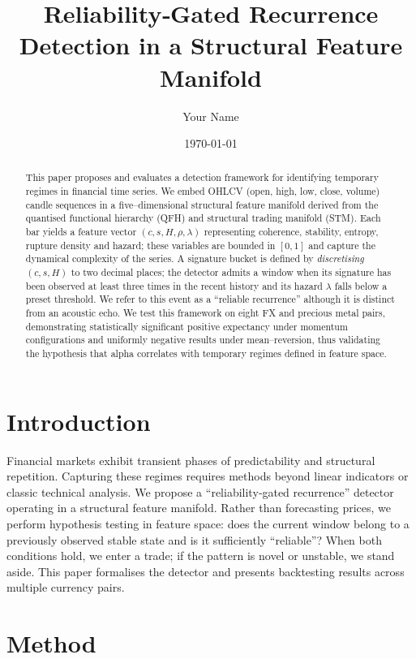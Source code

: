 \documentclass[11pt]{article}
\title{Reliability‑Gated Recurrence Detection in a Structural Feature Manifold}
\author{Your Name}
\date{\today}
\begin{document}
\maketitle

\begin{abstract}
This paper proposes and evaluates a detection framework for
identifying temporary regimes in financial time series.  We embed
OHLCV (open, high, low, close, volume) candle sequences in a
five–dimensional structural feature manifold derived from the
quantised functional hierarchy (QFH) and structural trading manifold
(STM).  Each bar yields a feature vector $(c,s,H,\rho,\lambda)$
representing coherence, stability, entropy, rupture density and
hazard; these variables are bounded in $[0,1]$ and capture the
dynamical complexity of the series.  A signature bucket is defined by
\emph{discretising} $(c,s,H)$ to two decimal places; the detector admits a
window when its signature has been observed at least three times in
the recent history and its hazard $\lambda$ falls below a preset
threshold.  We refer to this event as a ``reliable recurrence''
although it is distinct from an acoustic echo.  We test this
framework on eight FX and precious metal pairs, demonstrating
statistically significant positive expectancy under momentum
configurations and uniformly negative results under mean–reversion,
thus validating the hypothesis that alpha correlates with temporary
regimes defined in feature space.
\end{abstract}

\section{Introduction}
Financial markets exhibit transient phases of predictability and
structural repetition.  Capturing these regimes requires methods
beyond linear indicators or classic technical analysis.  We propose a
``reliability‑gated recurrence'' detector operating in a structural
feature manifold.  Rather than forecasting prices, we perform
hypothesis testing in feature space: does the current window belong
to a previously observed stable state and is it sufficiently
``reliable''?  When both conditions hold, we enter a trade; if the
pattern is novel or unstable, we stand aside.  This paper formalises
the detector and presents backtesting results across multiple
currency pairs.

\section{Method}
\end{document}
